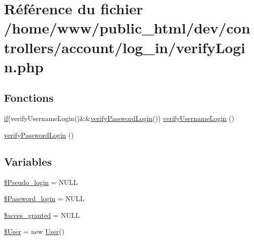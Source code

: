\hypertarget{verify_login_8php}{\section{Référence du fichier /home/www/public\-\_\-html/dev/controllers/account/log\-\_\-in/verify\-Login.php}
\label{verify_login_8php}
}
\subsection*{Fonctions}
\begin{DoxyCompactItemize}
\item 
\hyperlink{forgot__password__result_8php_ab625f12aec73d0a4f0bc8286f088ec1f}{if}(verify\-Username\-Login()\&\&\hyperlink{verify_login_8php_a969d3c0f7b25cfb69ecbcf931f97a5f8}{verify\-Password\-Login}()) \hyperlink{verify_login_8php_a6ba56bf7fdae3fb98a0f1ee818d5ac8a}{verify\-Username\-Login} ()
\item 
\hyperlink{verify_login_8php_a969d3c0f7b25cfb69ecbcf931f97a5f8}{verify\-Password\-Login} ()
\end{DoxyCompactItemize}
\subsection*{Variables}
\begin{DoxyCompactItemize}
\item 
\hyperlink{verify_login_8php_a84dc6f144c3be815ccad38c60fa27409}{\$\-Pseudo\-\_\-login} = N\-U\-L\-L
\item 
\hyperlink{verify_login_8php_a86bc4d20608407aa4b4a7940aaef6002}{\$\-Password\-\_\-login} = N\-U\-L\-L
\item 
\hyperlink{verify_login_8php_a5767baa45643e3308557b6235c1624f3}{\$acces\-\_\-granted} = N\-U\-L\-L
\item 
\hyperlink{verify_login_8php_a77cc6ebf3902e67557ab5de9317a11c2}{\$\-User} = new \hyperlink{class_user}{User}()
\end{DoxyCompactItemize}


